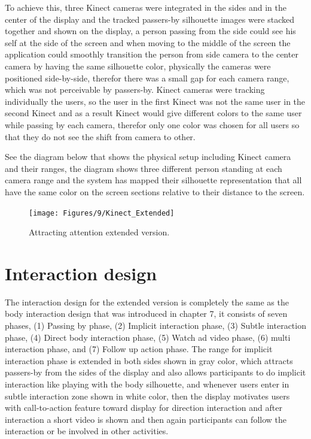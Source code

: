 To achieve this, three Kinect cameras were integrated in the sides and in the center of the display and the tracked passers-by silhouette images were stacked together and shown on the display, a person passing from the side could see his self at the side of the screen and when moving to the middle of the screen the application could smoothly transition the person from side camera to the center camera by having the same silhouette color, physically the cameras were positioned side-by-side, therefor there was a small gap for each camera range, which was not perceivable by passers-by. Kinect cameras were tracking individually the users, so the user in the first Kinect was not the same user in the second Kinect and as a result Kinect would give different colors to the same user while passing by each camera, therefor only one color was chosen for all users so that they do not see the shift from camera to other. 

See the diagram below that shows the physical setup including Kinect camera and their ranges, the diagram shows three different person standing at each camera range and the system has mapped their silhouette representation that all have the same color on the screen sections relative to their distance to the screen.


\begin{figure}[H]
    \centering
    \texttt{[image: Figures/9/Kinect\_Extended]}
    \caption{Attracting attention extended version.}%
    \label{fig:KinectExtended}%
\end{figure}


\section{Interaction design}
The interaction design for the extended version is completely the same as the body interaction design that was introduced in chapter 7, it consists of seven phases, (1) Passing by phase, (2) Implicit interaction phase, (3) Subtle interaction phase, (4) Direct body interaction phase, (5) Watch ad video phase, (6) multi interaction phase, and (7) Follow up action phase. The range for implicit interaction phase is extended in both sides shown in gray color, which attracts passers-by from the sides of the display and also allows participants to do implicit interaction like playing with the body silhouette, and whenever users enter in subtle interaction zone shown in white color, then the display motivates users with call-to-action feature toward display for direction interaction and after interaction a short video is shown and then again participants can follow the interaction or be involved in other activities.

